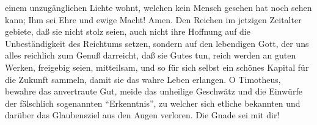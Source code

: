 einem unzugänglichen Lichte wohnt, welchen kein Mensch gesehen hat noch
sehen kann; Ihm sei Ehre und ewige Macht! Amen.  Den
Reichen im jetzigen Zeitalter gebiete, daß sie nicht stolz seien, auch
nicht ihre Hoffnung auf die Unbeständigkeit des Reichtums setzen,
sondern auf den lebendigen Gott, der uns alles reichlich zum Genuß
darreicht,  daß sie Gutes tun, reich werden an guten
Werken, freigebig seien, mitteilsam,  und so für sich
selbst ein schönes Kapital für die Zukunft sammeln, damit sie das wahre
Leben erlangen.  O Timotheus, bewahre das anvertraute
Gut, meide das unheilige Geschwätz und die Einwürfe der fälschlich
sogenannten ``Erkenntnis'',  zu welcher sich etliche
bekannten und darüber das Glaubensziel aus den Augen verloren. Die Gnade
sei mit dir!
